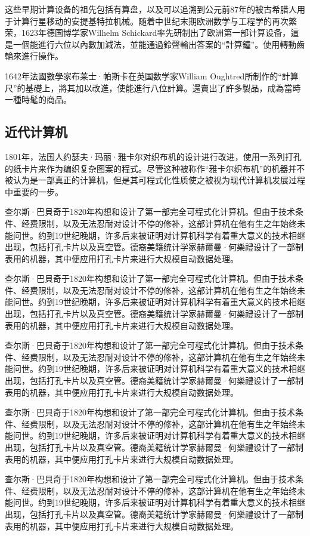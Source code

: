 \documentclass[oneside,a4paper,12pt,AutoFakeBold]{book}%
\begin{document}
这些早期计算设备的祖先包括有算盘，以及可以追溯到公元前87年的被古希腊人用于计算行星移动的安提基特拉机械。随着中世纪末期欧洲数学与工程学的再次繁荣，1623年德国博学家Wilhelm Schickard率先研制出了欧洲第一部计算设备，這是一個能進行六位以內數加減法，並能通過鈴聲輸出答案的“計算鐘”。使用轉動齒輪來進行操作。

1642年法國數學家布莱士·帕斯卡在英国数学家William Oughtred所制作的“計算尺”的基礎上，將其加以改進，使能進行八位計算。還賣出了許多製品，成為當時一種時髦的商品。

\subsection{近代计算机}
1801年，法国人约瑟夫·玛丽·雅卡尔对织布机的设计进行改进，使用一系列打孔的纸卡片来作为编织复杂图案的程式。尽管这种被称作“雅卡尔织布机”的机器并不被认为是一部真正的计算机，但是其可程式化性质使之被视为现代计算机发展过程中重要的一步。

查尔斯·巴貝奇于1820年构想和设计了第一部完全可程式化计算机。但由于技术条件、经费限制，以及无法忍耐对设计不停的修补，这部计算机在他有生之年始终未能问世。约到19世纪晚期，许多后来被证明对计算机科学有着重大意义的技术相继出现，包括打孔卡片以及真空管。德裔美籍统计学家赫爾曼·何樂禮设计了一部制表用的机器，其中便应用打孔卡片来进行大规模自动数据处理。

查尔斯·巴貝奇于1820年构想和设计了第一部完全可程式化计算机。但由于技术条件、经费限制，以及无法忍耐对设计不停的修补，这部计算机在他有生之年始终未能问世。约到19世纪晚期，许多后来被证明对计算机科学有着重大意义的技术相继出现，包括打孔卡片以及真空管。德裔美籍统计学家赫爾曼·何樂禮设计了一部制表用的机器，其中便应用打孔卡片来进行大规模自动数据处理。

查尔斯·巴貝奇于1820年构想和设计了第一部完全可程式化计算机。但由于技术条件、经费限制，以及无法忍耐对设计不停的修补，这部计算机在他有生之年始终未能问世。约到19世纪晚期，许多后来被证明对计算机科学有着重大意义的技术相继出现，包括打孔卡片以及真空管。德裔美籍统计学家赫爾曼·何樂禮设计了一部制表用的机器，其中便应用打孔卡片来进行大规模自动数据处理。

查尔斯·巴貝奇于1820年构想和设计了第一部完全可程式化计算机。但由于技术条件、经费限制，以及无法忍耐对设计不停的修补，这部计算机在他有生之年始终未能问世。约到19世纪晚期，许多后来被证明对计算机科学有着重大意义的技术相继出现，包括打孔卡片以及真空管。德裔美籍统计学家赫爾曼·何樂禮设计了一部制表用的机器，其中便应用打孔卡片来进行大规模自动数据处理。

查尔斯·巴貝奇于1820年构想和设计了第一部完全可程式化计算机。但由于技术条件、经费限制，以及无法忍耐对设计不停的修补，这部计算机在他有生之年始终未能问世。约到19世纪晚期，许多后来被证明对计算机科学有着重大意义的技术相继出现，包括打孔卡片以及真空管。德裔美籍统计学家赫爾曼·何樂禮设计了一部制表用的机器，其中便应用打孔卡片来进行大规模自动数据处理。
\end{document}

